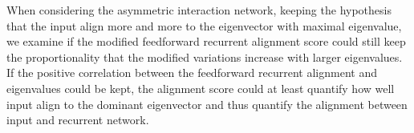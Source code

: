 \documentclass[11pt]{article}
\begin{document}
	When considering the asymmetric interaction network, keeping the hypothesis that the input align more and more to the eigenvector with maximal eigenvalue, we examine if the modified feedforward recurrent alignment score could still keep the proportionality that the modified variations increase with larger eigenvalues.
	If the positive correlation between the feedforward recurrent alignment and eigenvalues could be kept, the alignment score could at least quantify how well input align to the dominant eigenvector and thus quantify the alignment between input and recurrent network. 
	
\end{document}
